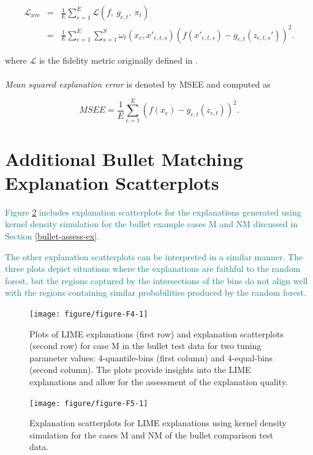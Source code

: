 \documentclass[AMS,STIX2COL]{WileyNJD-v2}\usepackage[]{graphicx}\usepackage[]{color}
\newenvironment{knitrout}{}{} %
\newcommand{\kge}[1]{\textcolor{teal}{#1}}
\begin{document}
\begin{eqnarray*} \mathcal{L}_{\mbox{ave}} & = & \frac{1}{E}\sum_{e=1}^E\mathcal{L}(f, \ g_{e,t}, \ \pi_{t}) \\ & = & \frac{1}{E}\sum_{e=1}^E\sum_{s=1}^{S}\omega_{t}\left(x_e, x'_{e,t,s}\right)\left(f\left(x'_{e,t,s}\right)-g_{e,t}\left(z_{e,t,s}'\right)\right)^2. \end{eqnarray*}

\noindent where $\mathcal{L}$ is the fidelity metric originally defined in \citet{ribeiro:2016}.\\
\\
\emph{Mean squared explanation error} is denoted by MSEE and computed as

$$MSEE=\frac{1}{E}\sum_{e=1}^E\left(f\left(x_e\right)-g_{e,t}\left(z_{e,t}\right)\right)^2.$$

\section{Additional Bullet Matching Explanation Scatterplots} \label{bullets-plus}

\kge{Figure \ref{fig:figure-F5} includes explanation scatterplots for the explanations generated using kernel density simulation for the bullet example cases M and NM discussed in Section \ref{bullet-assess-ex}.}

\kge{The other explanation scatterplots can be interpreted in a similar manner. The three plots depict situations where the explanations are faithful to the random forest, but the regions captured by the intersections of the bins do not align well with the regions containing similar probabilities produced by the random forest.}

\begin{figure}[!thp]
\begin{knitrout}
\color{fgcolor}

{\centering \texttt{[image: figure/figure-F4-1]} 

}



\end{knitrout}
\caption{Plots of LIME explanations (first row) and explanation scatterplots (second row) for case M in the bullet test data for two tuning parameter values: 4-quantile-bins (first column) and 4-equal-bins (second column). The plots provide insights into the LIME explanations and allow for the assessment of the explanation quality.}
\label{fig:figure-F4}
\end{figure}

\begin{figure}[!thp]
\begin{knitrout}
\color{fgcolor}

{\centering \texttt{[image: figure/figure-F5-1]} 

}



\end{knitrout}
\caption{Explanation scatterplots for LIME explanations using kernel density simulation for the cases M and NM of the bullet comparison test data.}
\label{fig:figure-F5}
\end{figure}
\end{document}
